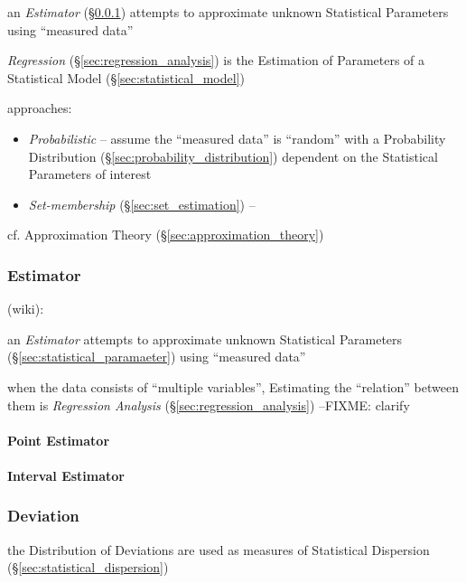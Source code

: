 an \emph{Estimator} (\S\ref{sec:estimator}) attempts to approximate unknown
Statistical Parameters using ``measured data''

\emph{Regression} (\S\ref{sec:regression_analysis}) is the Estimation of
Parameters of a Statistical Model (\S\ref{sec:statistical_model})

approaches:
\begin{itemize}
  \item \emph{Probabilistic} -- assume the ``measured data'' is ``random'' with
    a Probability Distribution (\S\ref{sec:probability_distribution}) dependent
    on the Statistical Parameters of interest
  \item \emph{Set-membership} (\S\ref{sec:set_estimation}) -- 
\end{itemize}

\fist cf. Approximation Theory (\S\ref{sec:approximation_theory})



\subsubsection{Estimator}\label{sec:estimator}

(wiki):

an \emph{Estimator} attempts to approximate unknown Statistical Parameters
(\S\ref{sec:statistical_paramaeter}) using ``measured data''

when the data consists of ``multiple variables'', Estimating the ``relation''
between them is \emph{Regression Analysis} (\S\ref{sec:regression_analysis})
--FIXME: clarify



\paragraph{Point Estimator}\label{sec:point_estimator}\hfill

\paragraph{Interval Estimator}\label{sec:interval_estimator}\hfill



\subsubsection{Deviation}\label{sec:deviation}

\fist the Distribution of Deviations are used as measures of Statistical
Dispersion (\S\ref{sec:statistical_dispersion})



